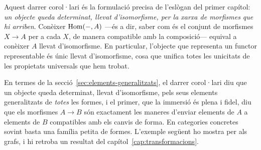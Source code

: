 \begin{observacio}
Aquest darrer corol·lari és la formulació precisa de l'eslògan del primer capítol: \emph{un objecte queda determinat, llevat d'isomorfisme, per la xarxa de morfismes que hi arriben}. Conèixer $\operatorname{Hom}(-,A)$ ---és a dir, saber com és el conjunt de morfismes $X\to A$ per a cada $X$, de manera compatible amb la composició--- equival a conèixer $A$ llevat d'isomorfisme. En particular, l'objecte que representa un functor representable és únic llevat d'isomorfisme, cosa que unifica totes les unicitats de les propietats universals que hem trobat.
\end{observacio}

En termes de la secció~\ref{sec:elements-generalitzats}, el darrer corol·lari diu que un objecte queda determinat, llevat d'isomorfisme, pels seus elements generalitzats de \emph{totes} les formes, i el primer, que la immersió és plena i fidel, diu que els morfismes $A\to B$ són exactament les maneres d'enviar elements de $A$ a elements de $B$ compatibles amb els canvis de forma. En categories concretes sovint basta una família petita de formes. L'exemple següent ho mostra per als grafs, i hi retroba un resultat del capítol~\ref{cap:transformacions}.

